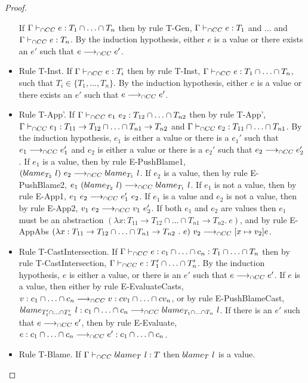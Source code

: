 \documentclass[a4paper]{article}
\begin{document}
\begin{proof}
\begin{itemize}
    If $\Gamma \vdash_{\cap CC} e : T_1 \cap \ldots \cap T_n$ then by rule T-Gen, $\Gamma \vdash_{\cap CC} e : T_1$ and ... and $\Gamma \vdash_{\cap CC} e : T_n$.
    By the induction hypothesis, either $e$ is a value or there exists an $e'$ such that $e \longrightarrow_{\cap CC} e'$.
    \item Rule T-Inst.
    If $\Gamma \vdash_{\cap CC} e : T_i$ then by rule T-Inst, $\Gamma \vdash_{\cap CC} e : T_1 \cap \ldots \cap T_n$, such that $T_i \in \{T_1, \ldots, T_n\}$.
    By the induction hypothesis, either $e$ is a value or there exists an $e'$ such that $e \longrightarrow_{\cap CC} e'$.
    \item Rule T-App'.
    If $\Gamma \vdash_{\cap CC} e_1\ e_2 : T_{12} \cap \ldots \cap T_{n2}$ then by rule T-App', $\Gamma \vdash_{\cap CC} e_1 : T_{11} \rightarrow T_{12} \cap \ldots \cap T_{n1} \rightarrow T_{n2}$ and $\Gamma \vdash_{\cap CC} e_2 : T_{11} \cap \ldots \cap T_{n1}$.
    By the induction hypothesis, $e_1$ is either a value or there is a $e_1'$ such that $e_1 \longrightarrow_{\cap CC} e_1'$ and $e_2$ is either a value or there is a $e_2'$ such that $e_2 \longrightarrow_{\cap CC} e_2'$.
    If $e_1$ is a value, then by rule E-PushBlame1, $(blame_{T_2}\ l)\ e_2 \longrightarrow_{\cap CC} blame_{T_1}\ l$.
    If $e_2$ is a value, then by rule E-PushBlame2, $e_1\ (\blame{T_2}{l}) \gios \blame{T_1}{l}$.
    If $e_1$ is not a value, then by rule E-App1, $e_1\ e_2 \longrightarrow_{\cap CC} e_1'\ e_2$.
    If $e_1$ is a value and $e_2$ is not a value, then by rule E-App2, $v_1\ e_2 \longrightarrow_{\cap CC} v_1\ e_2'$.
    If both $e_1$ and $e_2$ are values then $e_1$ must be an abstraction $(\lambda x : T_{11} \rightarrow T_{12} \cap \ldots \cap T_{n1} \rightarrow T_{n2} .\ e)$, and by rule E-AppAbs $(\lambda x : T_{11} \rightarrow T_{12} \cap \ldots \cap T_{n1} \rightarrow T_{n2}\ .\ e)\ v_2 \gios [x \mapsto v_2]e$.
    \item Rule T-CastIntersection.
    If $\Gamma \vdash_{\cap CC} e : c_1 \cap \ldots \cap c_n : T_1 \cap \ldots \cap T_n$ then by rule T-CastIntersection, $\Gamma \vdash_{\cap CC} e : T_1' \cap \ldots \cap T_n'$.
    By the induction hypothesis, $e$ is either a value, or there is an $e'$ such that $e \longrightarrow_{\cap CC} e'$.
    If $e$ is a value, then either by rule E-EvaluateCasts, $v : c_1 \cap \ldots \cap c_n \longrightarrow_{\cap CC} v : cv_1 \cap \ldots \cap cv_n$, or by rule E-PushBlameCast, $blame_{T_1' \cap \ldots \cap T_n'}\ l : c_1 \cap \ldots \cap c_n \longrightarrow_{\cap CC} blame_{T_1 \cap \ldots \cap T_n}\ l$.
    If there is an $e'$ such that $e \longrightarrow_{\cap CC} e'$, then by rule E-Evaluate, $e : c_1 \cap \ldots \cap c_n \longrightarrow_{\cap CC} e' : c_1 \cap \ldots \cap c_n$.
    \item Rule T-Blame.
    If $\Gamma \vdash_{\cap CC} blame_{T}\ l : T$ then $blame_{T}\ l$ is a value.
\end{itemize}
\end{proof}
\end{document}
